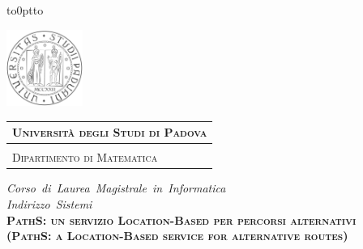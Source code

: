 \documentclass[a4paper, 12pt, twoside, openright]{book}
\begin{document}
\frontmatter

\begin{titlepage} %
\begin{center}
\vbox to0pt{\vbox to\vss}

\hspace{0.5cm}
\begin{minipage}{.20\textwidth}
  \includegraphics[height=2.5cm]{images/unipd-bn.png}
\end{minipage}\begin{minipage}{.90\textwidth}
  \begin{table}[H]
  \begin{tabular}{l}
  \scshape{\Large{\bfseries{Università degli Studi di Padova}}} \\
  \hline \\
  \scshape{\Large{Dipartimento di Matematica}} \\
  \end{tabular}
  \end{table}
\end{minipage}

\vspace{1cm}
\emph{\Large{Corso~di~Laurea~Magistrale~in~Informatica}} \\
\vspace{0.5cm}
\emph{\Large{Indirizzo~Sistemi}} \\
\vspace{1.5cm}
\scshape{\Large{\bfseries{PathS: un servizio Location-Based per percorsi alternativi}}} \\
\vspace{0.2cm} \linespread{1} \scshape{\large{\bfseries{(PathS: a Location-Based service for alternative routes)}}}
\end{center}


\end{titlepage}
\end{document}
